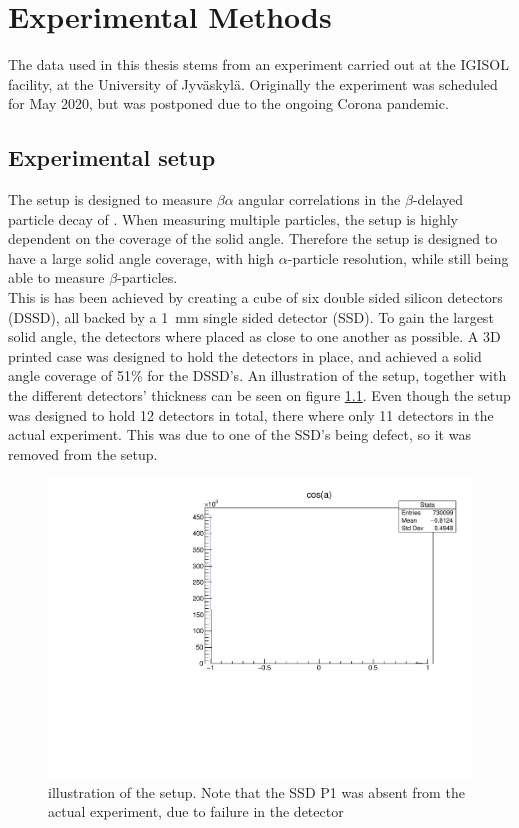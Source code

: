 \chapter{Experimental Methods}
The data used in this thesis stems from an experiment carried out at the IGISOL facility, at the University of Jyväskylä. Originally the experiment was scheduled for May 2020, but was postponed due to the ongoing Corona pandemic. 


\section{Experimental setup}
The setup is designed to measure $\beta\alpha$ angular correlations in the $\beta$-delayed particle decay of . When measuring multiple particles, the setup is highly dependent on the coverage of the solid angle. Therefore the setup is designed to have a large solid angle coverage, with high $\alpha$-particle resolution, while still being able to measure $\beta$-particles. \\
This is has been achieved by creating a cube of six double sided silicon detectors (DSSD), all backed by a \SI{1}{mm} single sided detector (SSD). To gain the largest solid angle, the detectors where placed as close to one another as possible. A 3D printed case was designed to hold the detectors in place, and achieved a solid angle coverage of 51\% for the DSSD's. An illustration of the setup, together with the different detectors' thickness can be seen on figure \ref{fig:opstilling}. 
Even though the setup was designed to hold 12 detectors in total, there where only 11 detectors in the actual experiment. This was due to one of the SSD's being defect, so it was removed from the setup. 

\begin{figure}[h]
	\includegraphics[width=\linewidth]{../figures/cosang.pdf}
	\caption{illustration of the setup. Note that the SSD P1 was absent from the actual experiment, due to failure in the detector}
	\label{fig:opstilling}
\end{figure}

